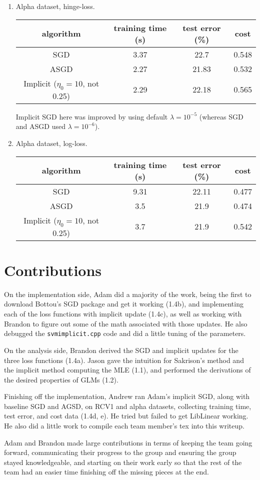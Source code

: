 \documentclass{article}
\begin{document}
\begin{enumerate}[(a)]
\begin{enumerate}[1.]
\item Alpha dataset, hinge-loss.
\begin{center}
\begin{tabular}{ c | c | c | c }
  algorithm & training time (s) & test error (\%) & cost \\ \hline                       
  SGD & 3.37 & 22.7 & 0.548\\
  ASGD & 2.27 & 21.83 & 0.532\\
  Implicit ($\eta_0=10$, not 0.25) & 2.29 & 22.18 & 0.565\\
\end{tabular}
\end{center}
Implicit SGD here was improved by using default $\lambda = 10^{-5}$ (whereas SGD and ASGD used $\lambda = 10^{-6}$).

\item Alpha dataset, log-loss.
\begin{center}
\begin{tabular}{ c | c | c | c }
  algorithm & training time (s) & test error (\%) & cost \\ \hline                       
  SGD & 9.31 &  22.11 & 0.477\\
  ASGD & 3.5 & 21.9 & 0.474\\
  Implicit ($\eta_0=10$, not 0.25) & 3.7 & 21.9 & 0.542\\
\end{tabular}
\end{center}
\end{enumerate}
\end{enumerate}

\section{Contributions}
On the implementation side, Adam did a majority of the work, being the first to download Bottou's SGD package and get it working (1.4b), and implementing each of the loss functions with implicit update (1.4c), as well as working with Brandon to figure out some of the math associated with those updates. He also debugged the \texttt{svmimplicit.cpp} code and did a little tuning of the parameters.

On the analysis side, Brandon derived the SGD and implicit updates for the three loss functions (1.4a). Jason gave the intuition for Sakrison's method and the implicit method computing the MLE (1.1), and performed the derivations of the desired properties of GLMs (1.2).

Finishing off the implementation, Andrew ran Adam's implicit SGD, along with baseline SGD and AGSD, on RCV1 and alpha datasets, collecting training time, test error, and cost data (1.4d, e). He tried but failed to get LibLinear working. He also did a little work to compile each team member's tex into this writeup.

Adam and Brandon made large contributions in terms of keeping the team going forward, communicating their progress to the group and ensuring the group stayed knowledgeable, and starting on their work early so that the rest of the team had an easier time finishing off the missing pieces at the end.
\end{document}
